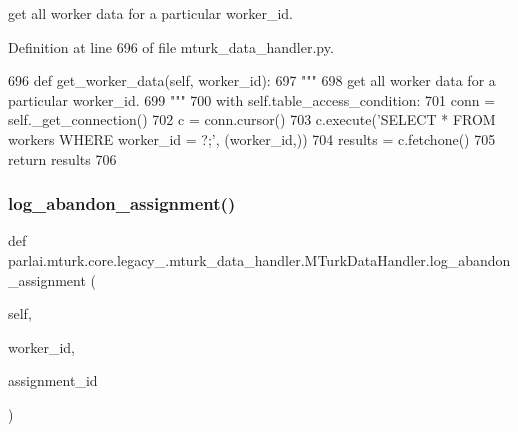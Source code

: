 \begin{DoxyVerb}get all worker data for a particular worker_id.
\end{DoxyVerb}
 

Definition at line 696 of file mturk\+\_\+data\+\_\+handler.\+py.


\begin{DoxyCode}
696     \textcolor{keyword}{def }get\_worker\_data(self, worker\_id):
697         \textcolor{stringliteral}{"""}
698 \textcolor{stringliteral}{        get all worker data for a particular worker\_id.}
699 \textcolor{stringliteral}{        """}
700         with self.table\_access\_condition:
701             conn = self.\_get\_connection()
702             c = conn.cursor()
703             c.execute(\textcolor{stringliteral}{'SELECT * FROM workers WHERE worker\_id = ?;'}, (worker\_id,))
704             results = c.fetchone()
705             \textcolor{keywordflow}{return} results
706 
\end{DoxyCode}
\mbox{\label{classparlai_1_1mturk_1_1core_1_1legacy__2018_1_1mturk__data__handler_1_1MTurkDataHandler_a6c4a99613bcdcf61126d251f7c5d0f29}} 
\subsubsection{\texorpdfstring{log\+\_\+abandon\+\_\+assignment()}{log\_abandon\_assignment()}}
{\footnotesize\ttfamily def parlai.\+mturk.\+core.\+legacy\+\_.\+mturk\+\_\+data\+\_\+handler.\+M\+Turk\+Data\+Handler.\+log\+\_\+abandon\+\_\+assignment (\begin{DoxyParamCaption}\item[{}]{self,  }\item[{}]{worker\+\_\+id,  }\item[{}]{assignment\+\_\+id }\end{DoxyParamCaption})}

